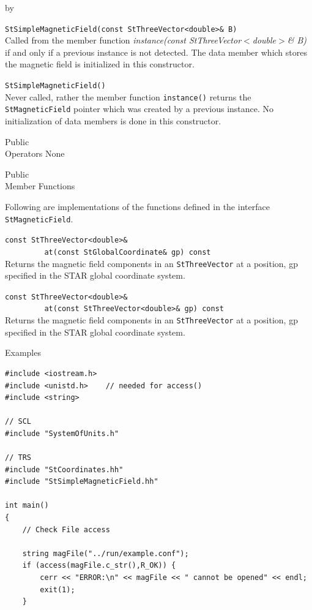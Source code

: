 \documentclass[twoside]{article}
\newcommand{\comp}[1]{\texttt{#1}}%
\newcommand{\entrylabel}[1]{\mbox{\textbf{{#1}}}\hfil}%
\newenvironment{entry}
{\begin{list}{}%
    {\renewcommand{\makelabel}{\entrylabel}%
     \setlength{\labelwidth}{90pt}%
     \setlength{\leftmargin}{\labelwidth}
     \advance\leftmargin by \labelsep%
      }%
    }%
  {\end{list}}
\newcommand{\Entrylabel}[1]%
{\raisebox{0pt}[1ex][0pt]{\makebox[\labelwidth][l]%
    {\parbox[t]{\labelwidth}{\hspace{0pt}\textbf{{#1}}}}}}
\newenvironment{Entry}%
{\renewcommand{\entrylabel}{\Entrylabel}\begin{entry}}%
  {\end{entry}}
\begin{document}
\begin{Entry}
   \verb+StSimpleMagneticField(const StThreeVector<double>& B)+\\
   Called from the member function {\em instance(const StThreeVector$<$double$>$\& B)}
   if and only if
   a previous instance is not detected.  The data member which
   stores the magnetic field is initialized in this constructor.

   \verb+StSimpleMagneticField()+\\
   Never called, rather the member function \texttt{instance()}
   returns the \comp{StMagneticField} pointer which was created by 
   a previous instance.  No initialization of data members is
   done in this constructor.

\item[Public \\ Operators]
   None

\item[Public \\ Member Functions]

  Following are implementations of the functions defined in
  the interface \comp{StMagneticField}.

  \verb+const StThreeVector<double>&+\\
  \verb+         at(const StGlobalCoordinate& gp) const+\\
  Returns the magnetic field components in an \comp{StThreeVector}
  at a position, gp specified in the STAR global coordinate system.

  \verb+const StThreeVector<double>&+\\
  \verb+         at(const StThreeVector<double>& gp) const+\\
  Returns the magnetic field components in an \comp{StThreeVector}
  at a position, gp specified in the STAR global coordinate system.

\item[Examples]
{\footnotesize
\begin{verbatim}
#include <iostream.h>
#include <unistd.h>    // needed for access()
#include <string>

// SCL
#include "SystemOfUnits.h"

// TRS
#include "StCoordinates.hh"
#include "StSimpleMagneticField.hh"

int main()
{
    // Check File access

    string magFile("../run/example.conf");
    if (access(magFile.c_str(),R_OK)) {
        cerr << "ERROR:\n" << magFile << " cannot be opened" << endl;
        exit(1);
    }
    

\end{verbatim}}
\end{Entry}
\end{document}
